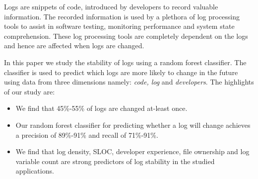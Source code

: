 Logs are snippets of code, introduced by developers to record valuable information. The recorded information is used by a plethora of log processing tools to assist in software testing, monitoring performance and system state comprehension. These log processing tools are completely dependent on the logs and hence are affected when logs are changed.

 In this paper we study the stability of logs using a random forest classifier. The classifier is used to predict which logs are more likely to change in the future using data from three dimensions namely: \emph{code, log} and \emph{developers}. The highlights of our study are:

\begin{itemize}
	\item We find that 45\%-55\% of logs are changed at-least once.
	\item Our random forest classifier for predicting whether a log will change achieves a precision of 89\%-91\% and recall of 71\%-91\%. 
	\item We find that log density, SLOC, developer experience, file ownership and log variable count are strong predictors of log stability in the studied applications.  	
	
\end{itemize}




